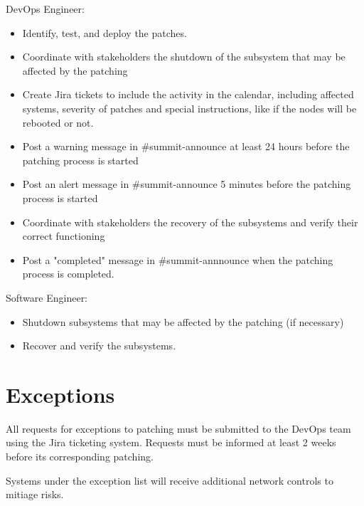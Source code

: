 DevOps Engineer:
\begin{itemize}
    \item Identify, test, and deploy the patches. 
    \item Coordinate with stakeholders the shutdown of the subsystem that may be affected by the patching
    \item Create Jira tickets to include the activity in the calendar, including affected systems, severity of patches and special instructions, like if the nodes will be rebooted or not. 
    \item Post a warning message in \#summit-announce at least 24 hours before the patching process is started
    \item Post an alert message in \#summit-announce 5 minutes before the patching process is started
    \item Coordinate with stakeholders the recovery of the subsystems and verify their correct functioning 
    \item Post a "completed" message in \#summit-annnounce when the patching process is completed. 
\end{itemize}

Software Engineer:
\begin{itemize}
    \item Shutdown subsystems that may be affected by the patching (if necessary)
    \item Recover and verify the subsystems. 
\end{itemize}

\section{Exceptions}

All requests for exceptions to patching must be submitted to the DevOps team using the Jira ticketing system. Requests must be informed at least 2 weeks before its corresponding patching. 

Systems under the exception list will receive additional network controls to mitiage risks. 